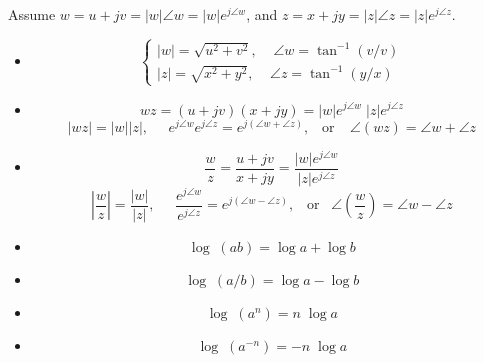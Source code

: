\documentclass{article}
\begin{document}
Assume $w=u+jv=|w|\angle w=|w|e^{j\angle w}$, and $z=x+jy=|z|\angle z=|z|e^{j\angle z}$. 
\begin{itemize}
  \item 
    \begin{equation}  \left\{ \begin{array}{l}
      |w|=\sqrt{u^2+v^2},\;\;\;\;\angle w=\tan^{-1}\left( v/v \right) \\
      |z|=\sqrt{x^2+y^2},\;\;\;\;\angle z=\tan^{-1}\left( y/x \right) \end{array} \right. \end{equation}
  \item 
    \begin{equation} w z=(u+jv)(x+jy)=|w|e^{j\angle w}\;|z|e^{j\angle z} \end{equation}
    \begin{equation} \left| wz \right| =|w||z|,\;\;\;\;\;
    e^{j\angle w} e^{j\angle z}=e^{j(\angle w+\angle z)},
    \;\;\;\mbox{or}\;\;\;\;
    \angle \left( wz \right) =\angle w+\angle z \end{equation}
  \item 
    \begin{equation} \frac{w}{z}=\frac{u+jv}{x+jy}=\frac{|w|e^{j\angle w}}{|z|e^{j\angle z}} \end{equation}
    \begin{equation} \left| \frac{w}{z} \right| =\frac{|w|}{|z|},\;\;\;\;\;
    \frac{e^{j\angle w}}{e^{j\angle z}}=e^{j(\angle w-\angle z)},\;\;\;\mbox{or}\;\;\;
    \angle \left( \frac{w}{z} \right)=\angle w-\angle z  \end{equation}
\end{itemize}

\begin{itemize}
  \item \begin{equation} \log \;(ab)=\log a+\log b \end{equation}
  \item \begin{equation} \log \;(a/b)=\log a-\log b \end{equation}
  \item \begin{equation} \log \;(a^n)=n\;\log a \end{equation}
  \item \begin{equation} \log \;(a^{-n})=-n\;\log a \end{equation}
\end{itemize}
\end{document}
